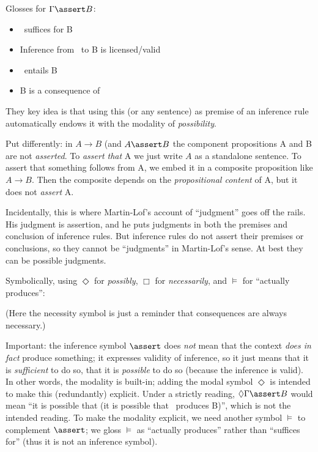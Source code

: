 \documentclass{article}
\begin{document}
Glosses for \(\Gamma\linfer B\):

\begin{itemize}
\item \Gamma\ suffices for B
\item Inference from \Gamma\ to B is licensed/valid
\item \Gamma\ entails B
\item B is a consequence of \Gamma
\end{itemize}

They key idea is that using this (or any sentence) as premise of an
inference rule automatically endows it with the modality of
\textit{possibility}.

Put differently: in \(A\rightarrow B\) (and \(A\linfer B\) the
component propositions A and B are not \textit{asserted}. To
\textit{assert that} A we just write \(A\) as a standalone sentence.
To assert that something follows from A, we embed it in a composite
proposition like \(A\rightarrow B\). Then the composite depends on the
\textit{propositional content} of A, but it does not \textit{assert}
A.

Incidentally, this is where Martin-Lof's account of ``judgment'' goes
off the rails. His judgment is assertion, and he puts judgments in
both the premises and conclusion of inference rules. But inference
rules do not assert their premises or conclusions, so they cannot be
``judgments'' in Martin-Lof's sense. At best they can be possible
judgments.

Symbolically, using \( \Diamond \) for \textit{possibly}, \(\Box\)
for \textit{necessarily}, and \(\models\) for ``actually produces'':


(Here the necessity symbol is just a reminder that consequences are
always necessary.)

Important: the inference symbol \(\linfer\) does \textit{not} mean that
the context \textit{does in fact} produce something; it expresses
validity of inference, so it just means that it is \textit{sufficient}
to do so, that it is \textit{possible} to do so (because the inference
is valid). In other words, the modality is built-in; adding the modal
symbol \(\Diamond\) is intended to make this (redundantly) explicit.
Under a strictly reading, \(\Diamond\Gamma\linfer B\) would mean ``it
is possible that (it is possible that \Gamma\ produces B)'', which is
not the intended reading. To make the modality explicit, we need
another symbol \(\models\) to complement \(\linfer\); we gloss
\(\models\) as ``actually produces'' rather than ``suffices for''
(thus it is not an inference symbol).
\end{document}
